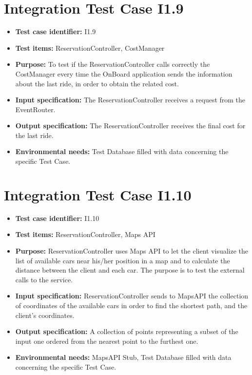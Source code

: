 \section{Integration Test Case I1.9}
\begin{itemize}
\item \textbf{Test case identifier:} I1.9
\item \textbf{Test items:} ReservationController, CostManager
\item \textbf{Purpose:} To test if the ReservationController calls correctly the CostManager every time the OnBoard application sends the information about the last ride, in order to obtain the related cost.
\item \textbf{Input specification:} The ReservationController receives a request from the EventRouter.
\item \textbf{Output specification:} The ReservationController receives the final cost for the last ride.
\item \textbf{Environmental needs:} Test Database filled with data concerning the specific Test Case.
\end{itemize}

\section{Integration Test Case I1.10}
\begin{itemize}
\item \textbf{Test case identifier:} I1.10
\item \textbf{Test items:} ReservationController, Maps API
\item \textbf{Purpose:} ReservationController uses Maps API to let the client visualize the list of available cars near his/her position in a map and to calculate the distance between the client and each car. The purpose is to test the external calls to the service.
\item \textbf{Input specification:} ReservationController sends to MapsAPI the collection of coordinates of the available cars in order to find the shortest path, and the client’s coordinates.
\item \textbf{Output specification:} A collection of points representing a subset of the input one ordered from the nearest point to the furthest one.
\item \textbf{Environmental needs:} MapsAPI Stub, Test Database filled with data concerning the specific Test Case.
\end{itemize}

